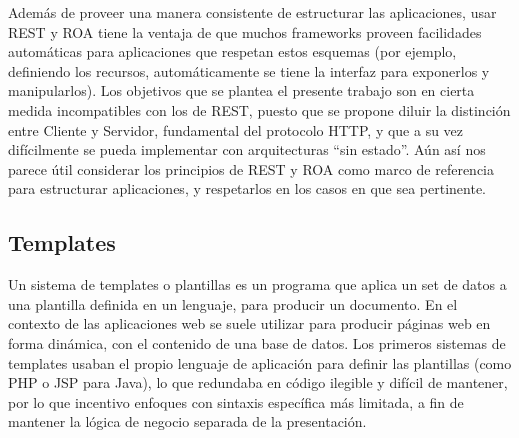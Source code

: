 \documentclass[doc,helv,longtable]{article}
\begin{document}
Además de proveer una manera consistente de estructurar las aplicaciones, usar REST y ROA tiene la ventaja de que muchos frameworks proveen facilidades automáticas para aplicaciones que respetan estos esquemas (por ejemplo, definiendo los recursos, automáticamente se tiene la interfaz para exponerlos y manipularlos). Los objetivos que se plantea el presente trabajo son en cierta medida incompatibles con los de REST, puesto que se propone diluir la distinción entre Cliente y Servidor, fundamental del protocolo HTTP, y que a su vez difícilmente se pueda implementar con arquitecturas “sin estado”. Aún así nos parece útil considerar los principios de REST y ROA como marco de referencia para estructurar aplicaciones, y respetarlos en los casos en que sea pertinente.

\subsection{Templates}
Un sistema de templates o plantillas es un programa que aplica un set de datos a una plantilla definida en un lenguaje, para producir un documento. En el contexto de las aplicaciones web se suele utilizar para producir páginas web en forma dinámica, con el contenido de una base de datos\cite{template}. Los primeros sistemas de templates usaban el propio lenguaje de aplicación para definir las plantillas (como PHP o JSP para Java), lo que redundaba en código ilegible y difícil de mantener, por lo que incentivo enfoques con sintaxis específica más limitada, a fin de mantener la lógica de negocio separada de la presentación\cite{logicless1}\cite{logicless2}.
\end{document}

